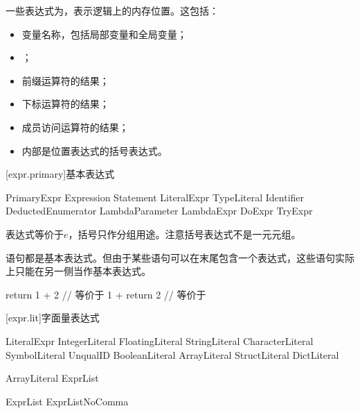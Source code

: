 \pnum
一些表达式为，表示逻辑上的内存位置。这包括：
\begin{itemize}
    \item 变量名称，包括局部变量和全局变量；
    \item {}；
    \item 前缀\tcode{*}运算符的结果；
    \item 下标运算符\tcode{[]}的结果；
    \item 成员访问运算符的结果；
    \item 内部是位置表达式的括号表达式。
\end{itemize}

[expr.primary]{基本表达式}

\begin{bnf}{PrimaryExpr}
    \terminal{(} Expression \terminal{)} \br
    Statement \br
    LiteralExpr \br
    TypeLiteral \br
    Identifier \br
    DeductedEnumerator \br
     \br
    \terminal{\$} \br
    LambdaParameter \br
    LambdaExpr \br
    DoExpr \br
    TryExpr
\end{bnf}

\pnum
表达式等价于$e$，括号只作分组用途。\enternote 注意括号表达式不是一元元组。\exitnote

\pnum
语句都是基本表达式。但由于某些语句可以在末尾包含一个表达式，这些语句实际上只能在另一侧当作基本表达式。

\enterexample
\begin{codeblock}

return 1 + 2 // 等价于
1 + return 2 // 等价于

\end{codeblock}
\exitexample

[expr.lit]{字面量表达式}

\begin{bnf}{LiteralExpr}
    IntegerLiteral \br
    FloatingLiteral \br
    StringLiteral \br
    CharacterLiteral \br
    SymbolLiteral \br
     UnqualID \terminal{)} \br
    BooleanLiteral \br
     \br
    ArrayLiteral \br
    StructLiteral \br
    DictLiteral
\end{bnf}

\begin{bnf}{ArrayLiteral}
    \terminal{[} ExprList\bnfq \terminal{]}
\end{bnf}

\begin{bnf}{ExprList}
    ExprListNoComma \terminal{,}\bnfq
\end{bnf}

